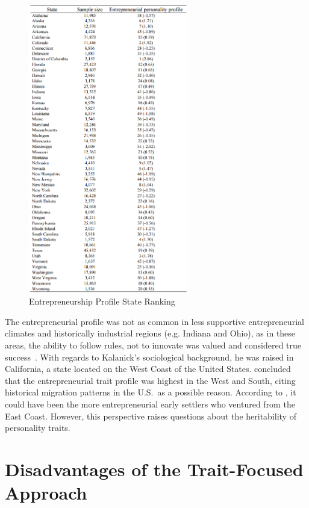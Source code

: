     \begin{figure}
      \centering
      \begin{minipage}{7cm}
        \centering
        \includegraphics[width=7cm]{inc/entrepreneurship_profile_state_ranking.png}
        \caption[Entrepreneurship Profile State Ranking]{Entrepreneurship Profile State Ranking~\parencite{obschonka2013}}
        \label{fig:entrepreneurship_profile_state_ranking}
      \end{minipage}
    \end{figure}

    The entrepreneurial profile was not as common in less supportive entrepreneurial climates and historically industrial regions (e.g. Indiana and Ohio), as in these areas, the ability to follow rules, not to innovate was valued and considered true success~\parencite{oconnor2013}. With regards to Kalanick’s sociological background, he was raised in California, a state located on the West Coast of the United States. \cite{obschonka2013} concluded that the entrepreneurial trait profile was highest in the West and South, citing historical migration patterns in the U.S.\ as a possible reason. According to \cite{rentfrow2008}, it could have been the more entrepreneurial early settlers who ventured from the East Coast. However, this perspective raises questions about the heritability of personality traits.

  \section{Disadvantages of the Trait-Focused Approach}\label{sec:disadvantages_of_the_trait-focused_approach}

